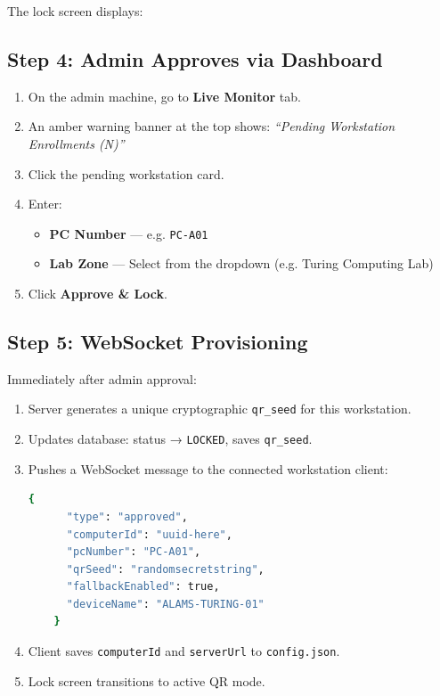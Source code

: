 The lock screen displays:
\begin{center}
\end{center}

\subsection{Step 4: Admin Approves via Dashboard}

\begin{enumerate}[leftmargin=*, label=\textbf{\arabic*.}]
  \item On the admin machine, go to \textbf{Live Monitor} tab.
  \item An amber warning banner at the top shows: \textit{``Pending Workstation Enrollments (N)''}
  \item Click the pending workstation card.
  \item Enter:
    \begin{itemize}
      \item \textbf{PC Number} — e.g. \texttt{PC-A01}
      \item \textbf{Lab Zone} — Select from the dropdown (e.g. Turing Computing Lab)
    \end{itemize}
  \item Click \textbf{Approve \& Lock}.
\end{enumerate}

\subsection{Step 5: WebSocket Provisioning}

Immediately after admin approval:
\begin{enumerate}[leftmargin=*, label={\textcolor{aurxongreen}{\faCheckCircle}}]
  \item Server generates a unique cryptographic \texttt{qr\_seed} for this workstation.
  \item Updates database: status → \texttt{LOCKED}, saves \texttt{qr\_seed}.
  \item Pushes a WebSocket message to the connected workstation client:
    \begin{tcolorbox}[codebox, title={WebSocket Approval Payload}]
    \begin{lstlisting}[language=bash]
    {
      "type": "approved",
      "computerId": "uuid-here",
      "pcNumber": "PC-A01",
      "qrSeed": "randomsecretstring",
      "fallbackEnabled": true,
      "deviceName": "ALAMS-TURING-01"
    }
    \end{lstlisting}
    \end{tcolorbox}
  \item Client saves \texttt{computerId} and \texttt{serverUrl} to \texttt{config.json}.
  \item Lock screen transitions to active QR mode.
\end{enumerate}

